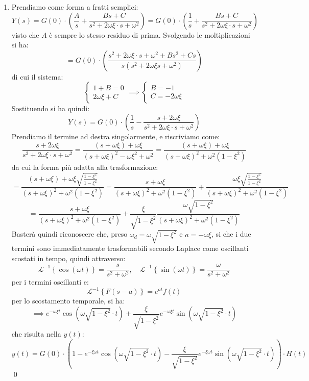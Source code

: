 \documentclass[a4paper,11pt]{article}
\begin{document}
\begin{enumerate}
\item Prendiamo come forma a fratti semplici:
	$$
	Y(s) = G(0) \cdot \left( \frac{A}{s} + \frac{Bs + C}{s^2 + 2\omega \xi \cdot s + \omega^2} \right) = G(0) \cdot \left( \frac{1}{s} + \frac{Bs + C}{s^2 + 2\omega \xi \cdot s + \omega^2} \right) 
	$$
	visto che $A$ è sempre lo stesso residuo di prima.
	Svolgendo le moltiplicazioni si ha:
	$$
	 = G(0) \cdot \left( \frac{s^2 + 2 \omega \xi \cdot s + \omega^2 + Bs^2 + Cs}{s (s^2 + 2 \omega \xi s + \omega^2)} \right)
	$$
	di cui il sistema:
	\[
		\begin{cases}
			1 + B = 0 \\ 
			2 \omega \xi + C
		\end{cases} \implies
		\begin{cases}
			B = -1 \\ 
			C = - 2 \omega \xi	
		\end{cases}
	\]
	Sostituendo si ha quindi:
	$$
	Y(s) = G(0) \cdot \left( \frac{1}{s} - \frac{s + 2 \omega \xi}{s^2 + 2 \omega \xi \cdot s + \omega^2} \right)
	$$
	Prendiamo il termine ad destra singolarmente, e riscriviamo come:
	$$
	\frac{s + 2 \omega \xi}{s^2 + 2 \omega \xi \cdot s + \omega^2} = \frac{(s + \omega \xi) + \omega \xi}{(s + \omega \xi)^2 - \omega \xi^2 + \omega^2} = \frac{(s+ \omega \xi) + \omega \xi}{(s + \omega \xi)^2 + \omega^2 (1 - \xi^2)} 
	$$
	da cui la forma più adatta alla trasformazione:
	$$
	= \frac{(s+ \omega \xi) + \omega \xi \sqrt{ \frac{1 - \xi^2}{1 - \xi^2} }}{(s + \omega \xi)^2 + \omega^2 (1 - \xi^2)} = \frac{s + \omega \xi}{(s + \omega \xi)^2 + \omega^2 (1 - \xi^2)} + \frac{ \omega \xi \sqrt{ \frac{1 - \xi^2}{1 - \xi^2} } }{(s + \omega \xi)^2 + \omega^2 (1 - \xi^2)}
	$$
	$$
	= \frac{s + \omega \xi}{(s + \omega \xi)^2 + \omega^2 (1 - \xi^2)} + \frac{\xi}{\sqrt{1 - \xi^2}} \frac{ \omega \sqrt{ 1 - \xi^2 } }{(s + \omega \xi)^2 + \omega^2 (1 - \xi^2)}
	$$
	Basterà quindi riconoscere che, preso $\omega_d = \omega \sqrt{1 - \xi^2}$ e $a = -\omega \xi$, si che i due termini sono immediatamente trasformabili secondo Laplace come oscillanti scostati in tempo, quindi attraverso:
	$$
	\mathcal{L}^{-1} \left\{ \cos(\omega t) \right\} = \frac{s}{s^2 + \omega^2}, \quad \mathcal{L}^{-1} \left\{ \sin(\omega t) \right\} = \frac{\omega}{s^2 + \omega^2}
	$$
	per i termini oscillanti e:
	$$
	\mathcal{L}^{-1} \left\{ F(s - a) \right\} = e^{at} f(t)
	$$
	per lo scostamento temporale, si ha:
	$$
	\implies e^{-\omega \xi t} \cos\left(\omega \sqrt{ 1- \xi^2} \cdot t\right) + \frac{\xi}{\sqrt{1 - \xi^2}} e^{-\omega \xi t} \sin\left(\omega \sqrt{1 - \xi^2} \cdot t\right)
	$$
	che risulta nella $y(t)$:
	$$
y(t) = G(0) \cdot \left( 1 - e^{-\xi \omega t} \cos\left(\omega \sqrt{1 - \xi ^2} \cdot t \right) - \frac{\xi}{\sqrt{1 - \xi^2}} e^{-\xi \omega t} \sin\left( \omega \sqrt{1 - \xi^2} \cdot t \right) \right) \cdot H(t)
	$$ \qed
\end{enumerate}
\end{document}
